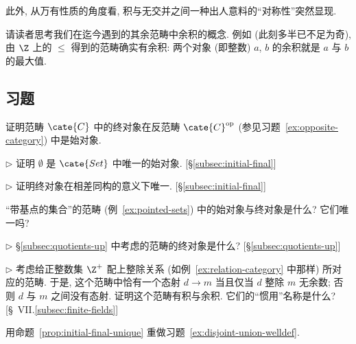 此外, 从万有性质的角度看, 积与无交并之间一种出人意料的``对称性''突然显现.

请读者思考我们在迄今遇到的其余范畴中余积的概念. 例如 (此刻多半已不足为奇), 由 $\Z$ 上的 $\leq$ 得到的范畴确实有余积: 两个对象 (即整数) $a$, $b$ 的余积就是 $a$ 与 $b$ 的最大值.

\subsection*{习题}
{}

\begin{prob}
\label{ex:final-initial-op}
证明范畴 $\cate{C}$ 中的终对象在反范畴 $\cate{C}\op$ (参见习题~\ref{ex:opposite-category}) 中是始对象.
\end{prob}

\begin{prob}
\label{ex:empty-initial}
$\triangleright$ 证明 $\emptyset$ 是 $\cate{Set}$ 中唯一的始对象. [\S\ref{subsec:initial-final}]
\end{prob}

\begin{prob}
\label{ex:final-unique}
$\triangleright$ 证明终对象在相差同构的意义下唯一. [\S\ref{subsec:initial-final}]
\end{prob}

\begin{prob}
\label{ex:initial-final-pointed}
``带基点的集合''的范畴 (例~\ref{ex:pointed-sets}) 中的始对象与终对象是什么? 它们唯一吗?
\end{prob}

\begin{prob}
\label{ex:final-quotient-category}
$\triangleright$ \S\ref{subsec:quotients-up} 中考虑的范畴的终对象是什么? [\S\ref{subsec:quotients-up}]
\end{prob}

\begin{prob}
\label{ex:divisibility-category}
$\triangleright$ 考虑给正整数集 $\Z^{+}$ 配上整除关系 (如例~\ref{ex:relation-category} 中那样) 所对应的范畴. 于是, 这个范畴中恰有一个态射 $d \rightarrow m$ 当且仅当 $d$ 整除 $m$ 无余数; 否则 $d$ 与 $m$ 之间没有态射. 证明这个范畴有积与余积. 它们的``惯用''名称是什么? [\S~VII.\ref{subsec:finite-fields}]
\end{prob}

\begin{prob}
\label{ex:redo-2-9}
用命题~\ref{prop:initial-final-unique} 重做习题~\ref{ex:disjoint-union-welldef}.
\end{prob}


